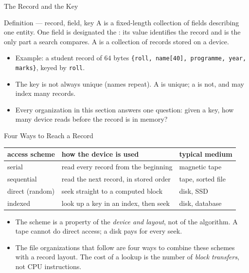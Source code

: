 \documentclass[aspectratio=169]{beamer}
\begin{document}
\begin{frame}{The Record and the Key}
  \begin{block}{Definition --- record, field, key}
    A  is a fixed-length collection of fields describing one
    entity. One field is designated the : its value identifies the
    record and is the only part a search compares. A  is a
    collection of records stored on a device.
  \end{block}
  \begin{itemize}
    \item Example: a student record of $64$ bytes
      \texttt{\{roll, name[40], programme, year, marks\}}, keyed by
      \texttt{roll}.
    \item The key is not always unique (names repeat). A  is
      unique; a  is not, and may index many records.
    \item Every organization in this section answers one question: given a
      key, how many device reads before the record is in memory?
  \end{itemize}
\end{frame}

\begin{frame}{Four Ways to Reach a Record}
  \begin{center}
  {\footnotesize
  \begin{tabular}{l p{4.3cm} p{5.4cm}}
    \toprule
    \textbf{access scheme} & \textbf{how the device is used} &
      \textbf{typical medium} \\
    \midrule
    serial & read every record from the beginning & magnetic tape \\
    sequential & read the next record, in stored order & tape, sorted file \\
    direct (random) & seek straight to a computed block & disk, SSD \\
    indexed & look up a key in an index, then seek & disk, database \\
    \bottomrule
  \end{tabular}}
  \end{center}
  \begin{itemize}
    \item The scheme is a property of the \emph{device and layout}, not of the
      algorithm. A tape cannot do direct access; a disk pays for every seek.
    \item The file organizations that follow are four ways to combine these
      schemes with a record layout. The cost of a lookup is the number of
      \emph{block transfers}, not CPU instructions.
  \end{itemize}
\end{frame}
\end{document}
